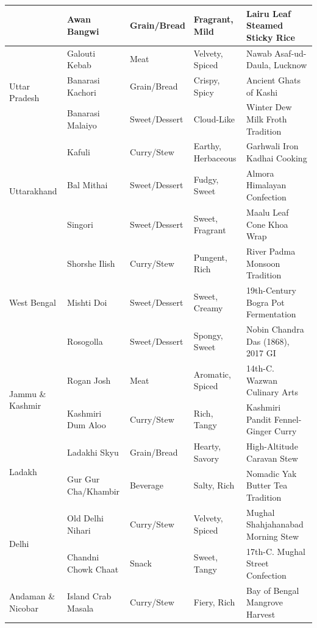 \documentclass[11pt,a4paper]{report}
\begin{document}
\begin{small}
\begin{longtable}{llllp{4.2cm}}
        & Awan Bangwi & Grain/Bread & Fragrant, Mild & Lairu Leaf Steamed Sticky Rice \\
    \midrule
    \multirow{3}{*}{Uttar Pradesh}
        & Galouti Kebab & Meat & Velvety, Spiced & Nawab Asaf-ud-Daula, Lucknow \\
        & Banarasi Kachori & Grain/Bread & Crispy, Spicy & Ancient Ghats of Kashi \\
        & Banarasi Malaiyo & Sweet/Dessert & Cloud-Like & Winter Dew Milk Froth Tradition \\
    \midrule
    \multirow{3}{*}{Uttarakhand}
        & Kafuli & Curry/Stew & Earthy, Herbaceous & Garhwali Iron Kadhai Cooking \\
        & Bal Mithai & Sweet/Dessert & Fudgy, Sweet & Almora Himalayan Confection \\
        & Singori & Sweet/Dessert & Sweet, Fragrant & Maalu Leaf Cone Khoa Wrap \\
    \midrule
    \multirow{3}{*}{West Bengal}
        & Shorshe Ilish & Curry/Stew & Pungent, Rich & River Padma Monsoon Tradition \\
        & Mishti Doi & Sweet/Dessert & Sweet, Creamy & 19th-Century Bogra Pot Fermentation \\
        & Rosogolla & Sweet/Dessert & Spongy, Sweet & Nobin Chandra Das (1868), 2017 GI \\
    \midrule
    \multirow{2}{*}{Jammu \& Kashmir}
        & Rogan Josh & Meat & Aromatic, Spiced & 14th-C. Wazwan Culinary Arts \\
        & Kashmiri Dum Aloo & Curry/Stew & Rich, Tangy & Kashmiri Pandit Fennel-Ginger Curry \\
    \midrule
    \multirow{2}{*}{Ladakh}
        & Ladakhi Skyu & Grain/Bread & Hearty, Savory & High-Altitude Caravan Stew \\
        & Gur Gur Cha/Khambir & Beverage & Salty, Rich & Nomadic Yak Butter Tea Tradition \\
    \midrule
    \multirow{2}{*}{Delhi}
        & Old Delhi Nihari & Curry/Stew & Velvety, Spiced & Mughal Shahjahanabad Morning Stew \\
        & Chandni Chowk Chaat & Snack & Sweet, Tangy & 17th-C. Mughal Street Confection \\
    \midrule
    \multirow{2}{*}{Andaman \& Nicobar}
        & Island Crab Masala & Curry/Stew & Fiery, Rich & Bay of Bengal Mangrove Harvest \\

\end{longtable}
\end{small}
\end{document}
